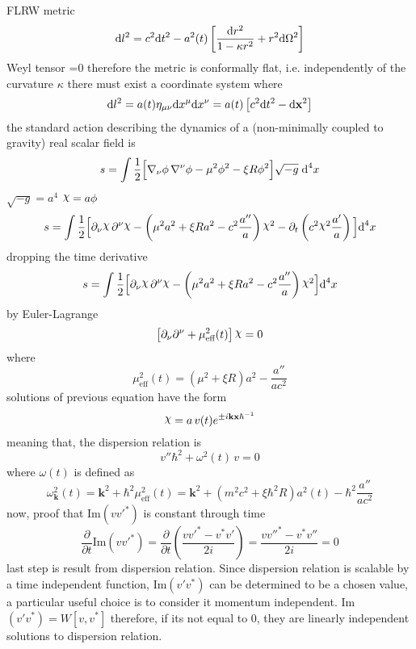 FLRW metric
\begin{equation}
	\text{d} l^2 =c^2\text{d} t^2 -a^2(t)\left[\frac{\text{d} r^2}{1-\kappa r^2}+r^2\text{d}\Omega^2\right]
\end{equation}
Weyl tensor =0 therefore the metric is conformally flat, i.e. independently of the curvature $\kappa$ there must exist a coordinate system where 
\begin{equation}
	\text{d} l^2=a(t)\eta_{\mu\nu}\text{d} x^\mu\text{d} x^\nu=a(t)\left[c^2\text{d} t^2-\text{d}\mathbf{x}^2\right]
\end{equation}
the standard action describing  the dynamics of a (non-minimally coupled to gravity) real scalar field is
\begin{equation}
	s=\int\frac{1}{2}\Big[\nabla_\nu\phi\,\nabla^\nu\phi-\mu^2\phi^2-\xi R\phi^2\Big]\sqrt{-g}\;\text{d}^4 x
\end{equation}
$\sqrt{-g}=a^4$ $\rchi=a\phi$
\begin{equation}
	s=\int\frac{1}{2}\Big[\partial_\nu\rchi\,\partial^\nu\rchi-\left(\mu^2a^2+\xi R a^2-c^2\frac{a''}{a}\right)\rchi^2-\partial_t\left(c^2\rchi^2\frac{a'}{a}\right)\Big]\td^4 x
\end{equation}
dropping the time derivative
\begin{equation}
	s=\int\frac{1}{2}\Big[\partial_\nu\rchi\,\partial^\nu\rchi-\left(\mu^2a^2+\xi R a^2-c^2\frac{a''}{a}\right)\rchi^2\Big]\td^4 x
\end{equation}
by Euler-Lagrange
\begin{equation}
	\left[\partial_\nu\partial^\nu+\mu_{\text{eff}}^2(t)\right]\rchi=0
\end{equation}
where
\begin{equation}
	\mu_{\text{eff}}^2(t)=\left(\mu^2+\xi R\right)a^2-\frac{a''}{ac^2}
\end{equation}
solutions of previous equation have the form
\begin{equation}
	\rchi=a\,v(t)e^{\pm i\mathbf{kx}\hbar^{-1}} 
\end{equation}
meaning that, the dispersion relation is
\begin{equation}
	v''\hbar^2+\omega^2(t)\,v=0
\end{equation}
where $\omega(t)$ is defined as
\begin{equation}
	\omega^2_{\mathbf k}(t)=\mathbf{k}^2+\hbar^2\mu_{\text{eff}}^2(t)=\mathbf{k}^2+\left(m^2c^2+\xi\hbar^2 R\right)a^2(t)-\hbar^2\frac{a''}{ac^2}
\end{equation}
now, proof that Im$(vv'^{*})$ is constant through time
\begin{equation}
	\frac{\partial}{\partial t}\text{Im}(vv'^{*})=\frac{\partial}{\partial t}\left(\frac{vv'^{*}-v^{*}v'}{2i}\right)=\frac{vv''^*-v^{*}v''}{2i}=0
\end{equation}
last step is result from dispersion relation. Since dispersion relation is scalable by a time independent function, Im$(v'v^*)$ can be determined to be a chosen value, a particular useful choice is to consider it momentum independent. Im$(v'v^*)=W[v,v^*]$ therefore, if  its not equal to 0, they are linearly independent solutions to dispersion relation.



